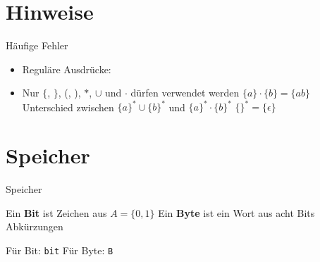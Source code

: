 \documentclass[handout]{beamer}
\begin{document}

\begin{frame}
	\titlepage
\end{frame}

\renewcommand{\ip}{} %


\section{Hinweise}

\begin{frame} {Häufige Fehler}
\begin{itemize}
	\item Reguläre Ausdrücke:
	\item Nur $\{$, $\}$, (, ), $*$, $\cup$ und $\cdot$ dürfen verwendet werden
	\pitem $\{a\} \cdot \{b\} = \{ab\}$
	\pitem Unterschied zwischen $\{a\}^* \cup \{b\}^*$ und $\{a\}^* \cdot \{b\}^*$
    \pitem $\{\}^* = \{\epsilon\}$
\end{itemize}
\end{frame}

\section{Speicher}

\begin{frame}{Speicher}
	\begin{itemize}
		\pitem Ein \textbf{Bit} ist Zeichen aus $A = \{0, 1\}$
		\pitem Ein \textbf{Byte} ist ein Wort aus acht Bits
		\pitem Abkürzungen
		\begin{itemize}
			\pitem Für Bit: \texttt{bit}
			\pitem Für Byte: \texttt{B}
		\end{itemize}
	\end{itemize}
\end{frame}
\end{document}
